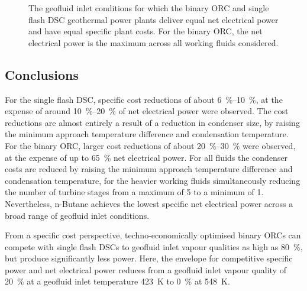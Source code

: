     \begin{figure}[H]
        \centering
        
        \caption[The geofluid inlet conditions for which the binary ORC and single flash DSC geothermal power plants deliver equal net electrical power and have equal specific plant costs.]{The geofluid inlet conditions for which the binary ORC and single flash DSC geothermal power plants deliver equal net electrical power and have equal specific plant costs. For the binary ORC, the net electrical power is the maximum across all working fluids considered.}
        \label{fig:prosim_purewater_Breakeven_DSC_vs_ORC_Wnet_techno}
    \end{figure}


\subsection{Conclusions}
    For the single flash \ac{DSC}, specific cost reductions of about \qtyrange{6}{10}{\percent}, at the expense of around \qtyrange{10}{20}{\percent} of net electrical power were observed. The cost reductions are almost entirely a result of a reduction in condenser size, by raising the minimum approach temperature difference and condensation temperature. For the binary \ac{ORC}, larger cost reductions of about \qtyrange{20}{30}{\percent} were observed, at the expense of up to \qty{65}{\percent} net electrical power. For all fluids the condenser costs are reduced by raising the minimum approach temperature difference and condensation temperature, for the heavier working fluids simultaneously reducing the number of turbine stages from a maximum of 5 to a minimum of 1. Nevertheless, n-Butane achieves the lowest specific net electrical power across a broad range of geofluid inlet conditions.
    
    From a specific cost perspective, techno-economically optimised binary ORCs can compete with single flash DSCs to geofluid inlet vapour qualities as high as \qty{80}{\percent}, but produce significantly less power. Here, the envelope for competitive specific power and net electrical power reduces from a geofluid inlet vapour quality of \qty{20}{\percent} at a geofluid inlet temperature \qty{423}{\K} to \qty{0}{\percent} at \qty{548}{\K}.

\clearpage
